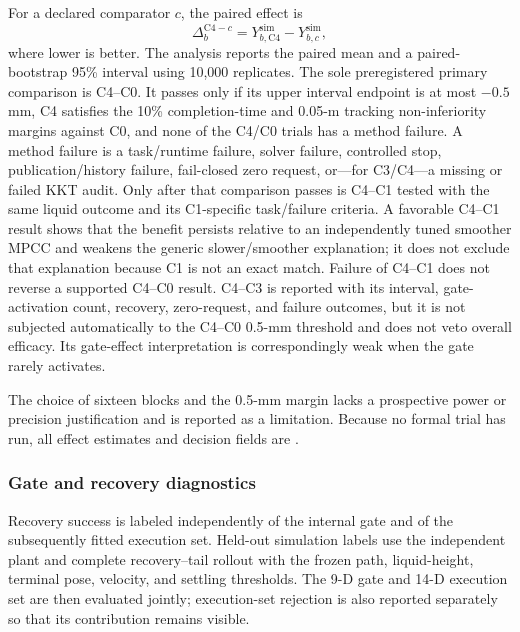 For a declared comparator $c$, the paired effect is
\begin{equation}
  \Delta_b^{\mathrm{C4}-c}
  =Y^{\mathrm{sim}}_{b,\mathrm{C4}}-Y^{\mathrm{sim}}_{b,c},
  \label{eq:primary_paired_effect}
\end{equation}
where lower is better.  The analysis reports the paired mean and a
paired-bootstrap 95\% interval using 10,000 replicates.  The sole preregistered
primary comparison is C4--C0.  It passes only if its upper interval endpoint is
at most $-0.5$ mm, C4 satisfies the 10\% completion-time and 0.05-m tracking
non-inferiority margins against C0, and none of the C4/C0 trials has a method
failure.  A method failure is a task/runtime failure, solver failure,
controlled stop, publication/history failure, fail-closed zero request, or---for
C3/C4---a missing or failed KKT audit.  Only after that comparison passes is
C4--C1 tested with the same
liquid outcome and its C1-specific task/failure criteria. A favorable C4--C1
result shows that the benefit persists relative to an independently tuned
smoother MPCC and weakens the generic slower/smoother explanation; it does not
exclude that explanation because C1 is not an exact match. Failure of C4--C1
does not reverse a supported C4--C0 result. C4--C3 is reported with its
interval, gate-activation count, recovery,
zero-request, and failure outcomes, but it is not subjected automatically to
the C4--C0 0.5-mm threshold and does not veto overall efficacy. Its gate-effect
interpretation is correspondingly weak when the gate rarely activates.

The choice of sixteen blocks and the 0.5-mm margin lacks a prospective power or
precision justification and is reported as a limitation. Because no formal
trial has run, all effect estimates and decision fields are \Pending{}.

\subsubsection{Gate and recovery diagnostics}

Recovery success is labeled independently of the internal gate and of the
subsequently fitted execution set.  Held-out simulation labels use the
independent plant and complete recovery--tail rollout with the frozen path,
liquid-height, terminal pose, velocity, and settling thresholds.  The 9-D gate
and 14-D execution set are then evaluated jointly; execution-set rejection is
also reported separately so that its contribution remains visible.

